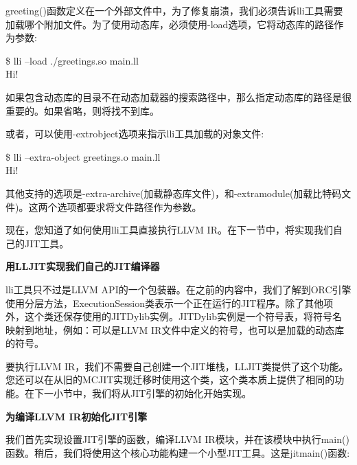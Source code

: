 greeting()函数定义在一个外部文件中，为了修复崩溃，我们必须告诉lli工具需要加载哪个附加文件。为了使用动态库，必须使用-load选项，它将动态库的路径作为参数:\par

\begin{tcolorbox}[colback=white,colframe=black]
\$ lli –load ./greetings.so main.ll \\
Hi!
\end{tcolorbox}

如果包含动态库的目录不在动态加载器的搜索路径中，那么指定动态库的路径是很重要的。如果省略，则将找不到库。\par

或者，可以使用-extrobject选项来指示lli工具加载的对象文件:\par

\begin{tcolorbox}[colback=white,colframe=black]
\$ lli –extra-object greetings.o main.ll \\
Hi!
\end{tcolorbox}

其他支持的选项是-extra-archive(加载静态库文件)，和-extramodule(加载比特码文件)。这两个选项都要求将文件路径作为参数。\par

现在，您知道了如何使用lli工具直接执行LLVM IR。在下一节中，将实现我们自己的JIT工具。\par

\hspace*{\fill} \par %
\textbf{用LLJIT实现我们自己的JIT编译器}

lli工具只不过是LLVM API的一个包装器。在之前的内容中，我们了解到ORC引擎使用分层方法，ExecutionSession类表示一个正在运行的JIT程序。除了其他项外，这个类还保存使用的JITDylib实例。JITDylib实例是一个符号表，将符号名映射到地址，例如：可以是LLVM IR文件中定义的符号，也可以是加载的动态库的符号。\par

要执行LLVM IR，我们不需要自己创建一个JIT堆栈，LLJIT类提供了这个功能。您还可以在从旧的MCJIT实现迁移时使用这个类，这个类本质上提供了相同的功能。在下一小节中，我们将从JIT引擎的初始化开始实现。\par

\hspace*{\fill} \par %
\textbf{为编译LLVM IR初始化JIT引擎}

我们首先实现设置JIT引擎的函数，编译LLVM IR模块，并在该模块中执行main()函数。稍后，我们将使用这个核心功能构建一个小型JIT工具。这是jitmain()函数:\par

